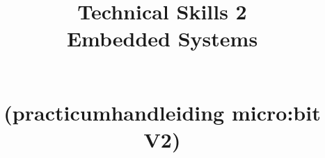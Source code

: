 \documentclass[12pt,openright,twoside]{report}
\date{}
\title{

{\vspace{-4cm}}
	{\hspace{-20pt}\begin{bfseries}\Huge{\color{black}Technical Skills 2 \\Embedded Systems} \end{bfseries}  } \\
	{(practicumhandleiding micro:bit V2)}
\ThisCenterWallPaper{0.8}{figuren/bbcmicrobitV2.png}

	{\vspace{12cm}}	
	{\color{white}  
	\raggedleft  \par}

}
\begin{document}
\maketitle


 \tableofcontents

\let\cleardoublepage\clearpage














\end{document}
